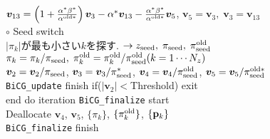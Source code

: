 \documentclass[12pt,titlepage]{jarticle}
\renewenvironment{leftbar}{%
  \def\FrameCommand{\vrule width 1pt \hspace{0pt}}%
  \MakeFramed {\advance\hsize-\width \FrameRestore}}%
 {\endMakeFramed}
\begin{document}
\begin{leftbar}
  \\\hspace{1.0cm}
  ${\boldsymbol v}_{1 3} = \left( 1 + \frac{\alpha^* \beta^*}{\alpha^{{\rm old} *}} \right) {\boldsymbol v}_3
  - \alpha^* {\boldsymbol v}_{1 3} - \frac{\alpha^* \beta^*}{\alpha^{{\rm old} *}} {\boldsymbol v}_5$, 
  ${\boldsymbol v}_5 = {\boldsymbol v}_3,\; 
  {\boldsymbol v}_3 = {\boldsymbol v}_{1 3}$
  \\\hspace{1.0cm}
  $\circ$ Seed switch
  \\\hspace{1.0cm}
  $|\pi_k|$が最も小さい$k$を探す. $\rightarrow z_{\rm seed},\; \pi_{\rm seed},\; \pi_{\rm seed}^{\rm old} $
  \\\hspace{1.0cm}
  $\pi_k = \pi_k /\pi_{\rm seed},\; \pi_k^{\rm old} = \pi_k^{\rm old} / \pi_{\rm seed}^{\rm old} (k=1 \cdots N_z)$
  \\\hspace{1.0cm}
  ${\boldsymbol v}_2 = {\boldsymbol v}_2 / \pi_{\rm seed}$,
  ${\boldsymbol v}_3 = {\boldsymbol v}_3 / \pi_{\rm seed}^*$, 
  ${\boldsymbol v}_4 = {\boldsymbol v}_4 / \pi_{\rm seed}^{\rm old}$,
  ${\boldsymbol v}_5 = {\boldsymbol v}_5 / \pi_{\rm seed}^{{\rm old} *}$
\\\hspace{0.5cm}
\verb|BiCG_update| finish
\end{leftbar}
\vspace{-1em}
\noindent
\hspace{0.5cm}
if($|{\boldsymbol v}_2| < $Threshold) exit
\\
end do iteration
\vspace{-1em}
\begin{leftbar}
\noindent
\verb|BiCG_finalize| start
\\ \hspace{0.5cm}
Deallocate ${\boldsymbol v}_4$, ${\boldsymbol v}_5$, $\{\pi_k\}$, $\{\pi_k^{\rm old}\}$, $\{{\bf p}_k\}$
\\
\verb|BiCG_finalize| finish
\end{leftbar}
\end{document}
